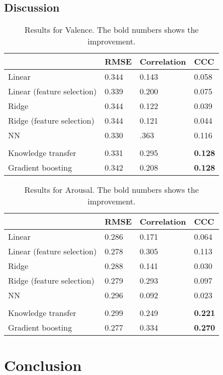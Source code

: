 \documentclass{article}
\begin{document}
\subsection{Discussion}

\begin{table}[h]
\centering
\begin{tabular}{|l|l|l|l|}
\hline
						& RMSE		& Correlation 	& CCC 	 \\ \hline
Linear 					& 0.344		& 0.143		& 0.058  \\ \hline	
Linear (feature selection)		& 0.339		& 0.200 		& 0.075	 \\ \hline
Ridge					& 0.344 		& 0.122		& 0.039	 \\ \hline
Ridge (feature selection)		& 0.344		& 0.121		& 0.044	 \\ \hline
NN						& 0.330		& .363		& 0.116 \\ \hline
& & & \\ \hline
Knowledge transfer 		& 0.331		& 0.295		& \textbf{0.128}	 \\ \hline
Gradient boosting 			& 0.342 		& 0.208 		& \textbf{0.128}  \\ \hline
\end{tabular}
\caption{Results for Valence. The bold numbers shows the improvement.}
\label{Valence_table}
\end{table}

\begin{table}[h]
\centering
\begin{tabular}{|l|l|l|l|}
\hline
						& RMSE		& Correlation 	& CCC 	 \\ \hline
Linear					& 0.286		& 0.171		& 0.064  \\ \hline	
Linear (feature selection)		& 0.278		& 0.305 		& 0.113	 \\ \hline
Ridge					& 0.288  		& 0.141		& 0.030	 \\ \hline
Ridge (feature selection)		& 0.279		& 0.293		& 0.097	 \\ \hline
NN						& 0.296		& 0.092		& 0.023 \\ \hline
& & & \\ \hline
Knowledge transfer 		& 0.299		& 0.249 		& \textbf{0.221}	 \\ \hline
Gradient boosting 			& 0.277 		& 0.334 		& \textbf{0.270}  \\ \hline
\end{tabular}
\caption{Results for Arousal. The bold numbers shows the improvement.}
\label{Arousal_table}
\end{table}

\section{Conclusion}

\footnotesize{
\begin{spacing}{.85 }


\end{spacing}
}
\end{document}
